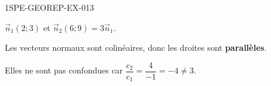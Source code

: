 \begin{corrige}{1SPE-GEOREP-EX-013}


$\vec{n}_1(2 ; 3)$ et $\vec{n}_2(6 ; 9) = 3\vec{n}_1$.

Les vecteurs normaux sont colinéaires, donc les droites sont \textbf{parallèles}.

Elles ne sont pas confondues car $\dfrac{c_2}{c_1} = \dfrac{4}{-1} = -4
\neq 3$.

\end{corrige}
